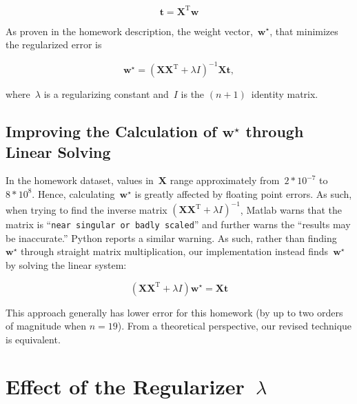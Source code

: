 \documentclass{report}
\newcommand{\wstar}{\mathbf{w}^{\star}}
\newcommand{\T}{^\textrm{T}}
\begin{document}
  \begin{equation}
    \mathbf{t}=\mathbf{X}\T
    \mathbf{w}
  \end{equation}\label{eq:tensorFunction}
  
  \noindent
  As proven in the homework description, the weight vector,~$\wstar$, that minimizes the regularized error is
  
  \begin{equation}
    \wstar=(\mathbf{X}\mathbf{X}^{\text{T}} + \lambda I)^{-1}\mathbf{X}\mathbf{t},
  \end{equation}\label{eq:wstarDef}
  
  \noindent
  where~$\lambda$ is a regularizing constant and~$I$ is the $(n+1)$~identity matrix.
  
  \subsection{Improving the Calculation of $\wstar$ through Linear Solving}
  
  In the homework dataset, values in~$\mathbf{X}$ range approximately from~${2*10^{-7}}$ to~${8*10^{8}}$.  Hence, calculating~$\wstar$ is greatly affected by floating point errors.  As such, when trying to find the inverse matrix ${(\mathbf{X}\mathbf{X}^{\text{T}} + \lambda I)^{-1}}$, Matlab warns that the matrix is ``\texttt{near singular or badly scaled}''  and further warns the ``results may be inaccurate.''  Python reports a similar warning.  As such, rather than finding~$\wstar$ through straight matrix multiplication, our implementation instead finds~$\wstar$ by solving the linear system:
    
  \begin{equation}
    (\mathbf{X}\mathbf{X}^{\text{T}} + \lambda I)\wstar=\mathbf{X}\mathbf{t}
  \end{equation}
  
  \noindent
  This approach generally has lower error for this homework (by up to two orders of magnitude when $n=19$).  From a theoretical perspective, our revised technique is equivalent.
      
  \section{Effect of the Regularizer~$\lambda$}
  
\end{document}
